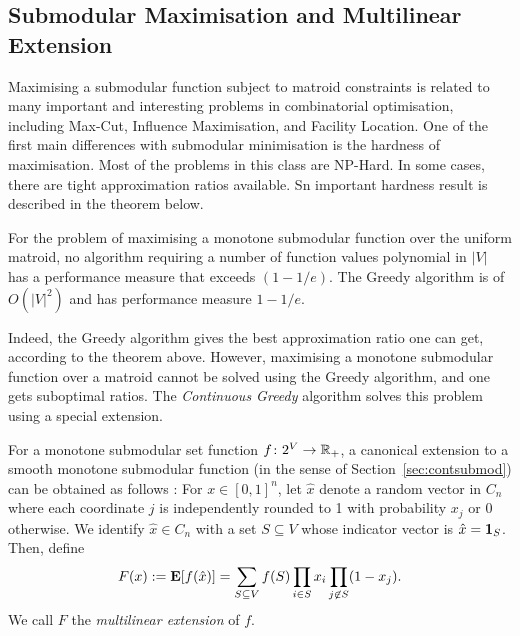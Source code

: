 \subsection{Submodular Maximisation and Multilinear Extension}
Maximising a submodular function subject to matroid constraints is related to many important and interesting problems in combinatorial optimisation, including Max-Cut, Influence Maximisation, and Facility Location. One of the first main differences with submodular minimisation is the hardness of maximisation. Most of the problems in this class are NP-Hard. In some cases, there are tight approximation ratios available. Sn important hardness result is described in the theorem below.

\begin{theorem}\label{thm:hardnesssubmod}
    For the problem of maximising a monotone submodular function over the uniform matroid, no algorithm requiring a number of function values polynomial in $|V|$ has a performance measure that exceeds $(1-1/e)$. The Greedy algorithm is of $O(|V|^2)$ and has performance measure $1-1/e$.
\end{theorem}
Indeed, the Greedy algorithm gives the best approximation ratio one can get, according to the theorem above. However, maximising a monotone submodular function over a matroid cannot be solved using the Greedy algorithm, and one gets suboptimal ratios. The \emph{Continuous Greedy} algorithm \citep{Calinescu2011} solves this problem using a special extension.

For a monotone submodular set function $f\colon 2^V \to \mathbb{R}_+$, a canonical extension to a smooth monotone submodular function (in the sense of Section~\ref{sec:contsubmod}) can be obtained as follows \citep{Calinescu2011}: For $x \in [0, 1]^n$, let $\hat{x}$ denote a random vector in $C_n$ where each coordinate $j$ is independently rounded to 1 with probability $x_j$ or 0 otherwise. We identify $\hat{x} \in C_n$ with a set $S \subseteq V$ whose indicator vector is $\hat{x} = \mathbf{1}_S$. Then, define
\[
    F(x) := \mathbf{E}[f(\hat{x})] = \sum_{S\subseteq V} f(S)\prod_{i\in S} x_i \prod_{j\not\in S}(1-x_j).
\]
We call $F$ the \emph{multilinear extension} of $f$.

